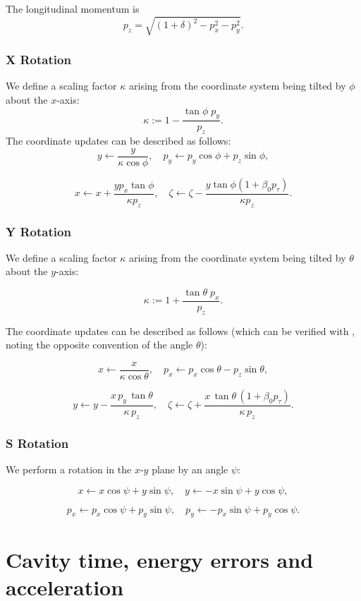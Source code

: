 The longitudinal momentum is
\[
	p_z = \sqrt{(1 + \delta)^2 - p_x^2 - p_y^2}.
\]

\subsubsection{X Rotation}

We define a scaling factor $\kappa$ arising from the coordinate system being tilted by $\phi$ about the $x$-axis:
\[
\kappa := 1 - \frac{\tan\phi \; p_y}{p_z}.
\]
The coordinate updates can be described as follows:
\[
y \leftarrow \frac{y}{\kappa \cos\phi}, \quad p_y \leftarrow p_y \cos\phi + p_z \sin\phi,
\]

\[
x \leftarrow x + \frac{y p_x \tan\phi}{\kappa p_z}, \quad \zeta \leftarrow \zeta - \frac{y \tan\phi \left(1 + \beta_0 p_\tau \right)}{\kappa p_z}.
\]

\subsubsection{Y Rotation}\label{sec:Yrotation}

We define a scaling factor $\kappa$ arising from the coordinate system being tilted by $\theta$ about the $y$-axis:

\[
\kappa := 1 + \frac{\tan\theta \; p_x}{p_z}.
\]

The coordinate updates can be described as follows (which can be verified with \cite{forest99}, noting the opposite convention of the angle $\theta$):

\[
x \leftarrow \frac{x}{\kappa \cos\theta},
\quad
p_x \leftarrow p_x \cos\theta - p_z \sin\theta,
\]

\[
y \leftarrow y - \frac{x\,p_y\,\tan\theta}{\kappa\,p_z},
\quad
\zeta \leftarrow \zeta + \frac{x\,\tan\theta\,(1 + \beta_0 p_\tau)}{\kappa\,p_z}.
\]

\subsubsection{S Rotation}

We perform a rotation in the $x$-$y$ plane by an angle $\psi$:

\[
x \leftarrow x \cos\psi + y \sin\psi,
\quad
y \leftarrow -x \sin\psi + y \cos\psi,
\]

\[
p_x \leftarrow p_x \cos\psi + p_y \sin\psi,
\quad
p_y \leftarrow -p_x \sin\psi + p_y \cos\psi.
\]


\section{Cavity time, energy errors and acceleration}

